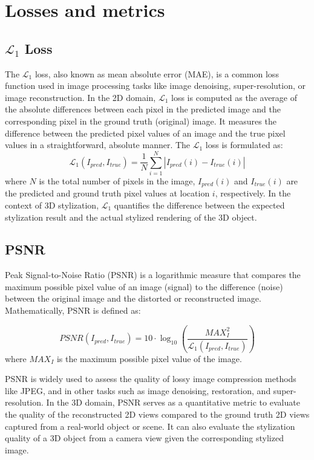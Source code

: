\section{Losses and metrics}

\subsection{$\mathcal{L}_1$ Loss}
The $\mathcal{L}_1$ loss, also known as mean absolute error (MAE), is a common loss function used in image processing tasks like image denoising, super-resolution, or image reconstruction. In the 2D domain, $\mathcal{L}_1$ loss is computed as the average of the absolute differences between each pixel in the predicted image and the corresponding pixel in the ground truth (original) image. It measures the difference between the predicted pixel values of an image and the true pixel values in a straightforward, absolute manner. The $\mathcal{L}_1$ loss is formulated as:
\begin{equation}
    \label{}
    \mathcal{L}_1(I_{pred},I_{true} ) = \frac{1}{N}  \sum ^N_{i = 1} | I_{pred}(i) - I_{true}(i)|
\end{equation}
where $N$ is the total number of pixels in the image, $I_{pred}(i)$ and $I_{true}(i)$ are the predicted and ground truth pixel values at location $i$, respectively. In the context of 3D stylization, $\mathcal{L}_1$ quantifies the difference between the expected stylization result and the actual stylized rendering of the 3D object.

\subsection{PSNR}
Peak Signal-to-Noise Ratio (PSNR) is a logarithmic measure that compares the maximum possible pixel value of an image (signal) to the difference (noise) between the original image and the distorted or reconstructed image. Mathematically, PSNR is defined as:

\begin{equation}
    PSNR(I_{pred},I_{true} ) = 10 \cdot \log_{10} (\frac{MAX_I^2}{\mathcal{L}_1(I_{pred},I_{true} )})
\end{equation}
where $MAX_I$ is the maximum possible pixel value of the image.

PSNR is widely used to assess the quality of lossy image compression methods like JPEG, and in other tasks such as image denoising, restoration, and super-resolution. In the 3D domain, PSNR serves as a quantitative metric to evaluate the quality of the reconstructed 2D views compared to the ground truth 2D views captured from a real-world object or scene. It can also evaluate the stylization quality of a 3D object from a camera view given the corresponding stylized image.

